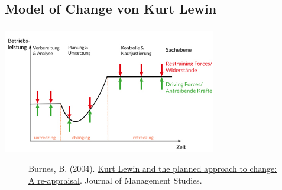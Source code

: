 \documentclass[aspectratio=169]{beamer}
\begin{document}
\subsection{Model of Change von Kurt Lewin}
\begin{frame}
\frametitle{\subsecname}\framesubtitle{\secname}
\centering
\includegraphics[width=0.7\textwidth]{pictures/3Phasen_Kurt_Lewin_web.jpg}
\vfill
\begin{figure}[!b]
  Burnes, B. (2004). \href{http://doi.org/10.1111/j.1467-6486.2004.00463.x}{Kurt Lewin and the planned approach to change: A re-appraisal}. Journal of Management Studies.
\end{figure}
\end{frame}
\end{document}
